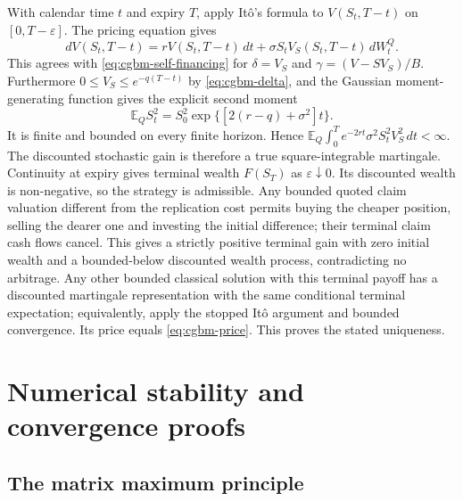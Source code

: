 \documentclass[11pt]{article}
\begin{document}
With calendar time $t$ and expiry $T$, apply It\^o's formula to
$V(S_t,T-t)$ on $[0,T-\varepsilon]$. The pricing equation gives
\begin{equation}
 dV(S_t,T-t)=rV(S_t,T-t)\,dt+
 \sigma S_tV_S(S_t,T-t)\,dW_t^Q.
 \label{eq:cgbm-replication-ito}
\end{equation}
This agrees with \eqref{eq:cgbm-self-financing} for $\delta=V_S$ and
$\gamma=(V-SV_S)/B$. Furthermore
$0\leq V_S\leq e^{-q(T-t)}$ by \eqref{eq:cgbm-delta}, and
the Gaussian moment-generating function gives the explicit second moment
\begin{equation}
 \mathbb E_Q S_t^2=S_0^2
 \exp\{[2(r-q)+\sigma^2]t\}.
 \label{eq:cgbm-asset-second-moment}
\end{equation}
It is finite and bounded on every finite horizon. Hence
$\mathbb E_Q\int_0^T e^{-2rt}\sigma^2 S_t^2 V_S^2\,dt<\infty$.
The discounted stochastic gain is therefore a true square-integrable
martingale. Continuity at expiry gives terminal wealth $F(S_T)$ as
$\varepsilon\downarrow0$. Its discounted wealth is non-negative, so the
strategy is admissible. Any bounded quoted claim valuation different from
the replication cost permits buying the cheaper position, selling the dearer
one and investing the initial difference; their terminal claim cash
flows cancel. This gives a strictly positive terminal gain with zero
initial wealth and a bounded-below discounted wealth process, contradicting
no arbitrage. Any other bounded classical solution with this terminal
payoff has a discounted martingale representation with the same
conditional terminal expectation; equivalently, apply the stopped
It\^o argument and bounded convergence. Its price equals
\eqref{eq:cgbm-price}. This proves the stated uniqueness.

\section{Numerical stability and convergence proofs}
\label{app:cgbm-numerical}

\subsection{The matrix maximum principle}
\end{document}
